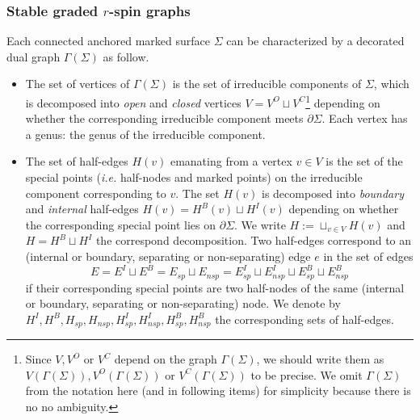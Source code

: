 \documentclass[11pt]{amsart}
\theoremstyle{definition}
\theoremstyle{remark}
\newcommand{\<}{\left<}
\renewcommand{\>}{\right>}
\numberwithin{equation}{section}
\begin{document}
\subsubsection{Stable graded $r$-spin graphs}
Each connected anchored marked surface $\Sigma$ can be characterized by a decorated dual graph $\Gamma(\Sigma)$ %
as follow.
\begin{itemize}
\item The %
set of vertices of $\Gamma(\Sigma)$ is the set of irreducible components of $\Sigma$, which is decomposed into \textit{open} and \textit{closed} vertices  $V = V^O \sqcup V^C$\footnote{Since $V,V^O$ or $V^C$ depend on the graph $\Gamma(\Sigma)$, we should write them as $V(\Gamma(\Sigma)),V^O(\Gamma(\Sigma))$ or $V^C(\Gamma(\Sigma))$ to be precise. We omit $\Gamma(\Sigma)$ from the notation here (and in following items) for simplicity because there is no no ambiguity.} depending on whether the corresponding irreducible component meets $\partial \Sigma$. 
Each vertex has a %
genus: the genus %
of the irreducible component.

\item The set of half-edges $H(v)$ emanating from a vertex $v\in V$ is the set of the special points %
(\textit{i.e.} half-nodes %
and marked points) on the irreducible component corresponding to $v$. The set $H(v)$ is decomposed into \textit{boundary} and \textit{internal} half-edges $H(v) = H^B(v) \sqcup H^I(v)$ depending on whether the corresponding special point lies on $\partial \Sigma$. We write $H:=\sqcup_{v\in V}H(v)$ and $H = H^B \sqcup H^I$ the correspond decomposition. Two half-edges correspond to an (internal or boundary, separating or non-separating) edge $e$ in the set of %
edges $$E=E^I\sqcup E^B=E_{sp}\sqcup E_{nsp}=E^I_{sp}\sqcup E^I_{nsp}\sqcup E^B_{sp}\sqcup E^B_{nsp}$$ if %
their corresponding special points are two half-nodes of the same (internal or boundary, separating or non-separating) node.  We denote by $H^I,H^B,H_{sp},H_{nsp},H^I_{sp},H^I_{nsp},H^B_{sp},H^B_{nsp}$ the corresponding sets of half-edges.


\end{itemize}
\end{document}
